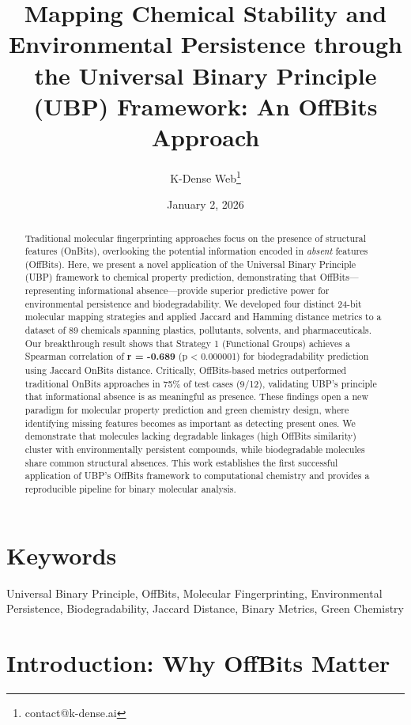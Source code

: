 \documentclass[11pt,letterpaper]{article}
\title{\textbf{Mapping Chemical Stability and Environmental Persistence through the Universal Binary Principle (UBP) Framework: An OffBits Approach}}
\author{K-Dense Web\thanks{contact@k-dense.ai}}
\date{January 2, 2026}
\begin{document}
\maketitle

\begin{abstract}
\noindent Traditional molecular fingerprinting approaches focus on the presence of structural features (OnBits), overlooking the potential information encoded in \textit{absent} features (OffBits). Here, we present a novel application of the Universal Binary Principle (UBP) framework to chemical property prediction, demonstrating that OffBits—representing informational absence—provide superior predictive power for environmental persistence and biodegradability. We developed four distinct 24-bit molecular mapping strategies and applied Jaccard and Hamming distance metrics to a dataset of 89 chemicals spanning plastics, pollutants, solvents, and pharmaceuticals. Our breakthrough result shows that Strategy 1 (Functional Groups) achieves a Spearman correlation of \textbf{r = -0.689} (p < 0.000001) for biodegradability prediction using Jaccard OnBits distance. Critically, OffBits-based metrics outperformed traditional OnBits approaches in 75\% of test cases (9/12), validating UBP's principle that informational absence is as meaningful as presence. These findings open a new paradigm for molecular property prediction and green chemistry design, where identifying missing features becomes as important as detecting present ones. We demonstrate that molecules lacking degradable linkages (high OffBits similarity) cluster with environmentally persistent compounds, while biodegradable molecules share common structural absences. This work establishes the first successful application of UBP's OffBits framework to computational chemistry and provides a reproducible pipeline for binary molecular analysis.
\end{abstract}

\section*{Keywords}
Universal Binary Principle, OffBits, Molecular Fingerprinting, Environmental Persistence, Biodegradability, Jaccard Distance, Binary Metrics, Green Chemistry

\newpage
\tableofcontents
\newpage

\section{Introduction: Why OffBits Matter}
\end{document}
